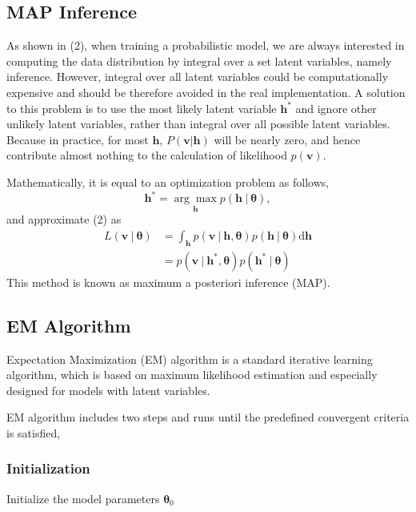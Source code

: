\documentclass[conference]{IEEEtran}
\begin{document}
\subsection{MAP Inference}
As shown in (2), when training a probabilistic model, we are always interested in computing the data distribution by integral over a set latent variables, namely inference. However, integral over all latent variables could be computationally expensive and should be therefore avoided in the real implementation. A solution to this problem is to use the most likely latent variable $\boldsymbol{h^*}$ and ignore other unlikely latent variables, rather than integral over all possible latent variables. Because in practice, for most $\boldsymbol{h}$, $P(\boldsymbol{v} |\boldsymbol{h})$ will be nearly zero, and hence contribute almost nothing to the calculation of likelihood $p(\boldsymbol{v})$. \cite{Goodfellow-et-al-2016}\cite{doersch2016tutorial}

Mathematically, it is equal to an optimization problem as follows,
\begin{equation}
\boldsymbol{h^*}=\underset{\boldsymbol{h}}{\arg\max}p(\boldsymbol{h}\ |\ \boldsymbol{\theta}),
\end{equation}
and approximate (2) as 
\begin{equation}
  \begin{split}
    L(\boldsymbol{v}\ |\ \boldsymbol{\theta}) &=\int_{\boldsymbol{h}}p(\boldsymbol{v} \ |\ \boldsymbol{h}, \boldsymbol{\theta})p(\boldsymbol{h}\ |\ \boldsymbol{\theta})\mathrm{d}\boldsymbol{h}\\
    &=p(\boldsymbol{v}\ |\ \boldsymbol{h^*}, \boldsymbol{\theta})p(\boldsymbol{h^*}\ |\ \boldsymbol{\theta})
  \end{split}  
\end{equation}
This method is known as maximum a posteriori inference (MAP).
\subsection{EM Algorithm}
Expectation Maximization (EM) \cite{moon1996expectation} algorithm is a standard iterative learning algorithm, which is based on maximum likelihood estimation and especially designed for models with latent variables. 

EM algorithm includes two steps and runs until the predefined convergent criteria is satisfied,
\subsubsection{Initialization}
Initialize the model parameters $\boldsymbol{\theta}_0$
\end{document}
